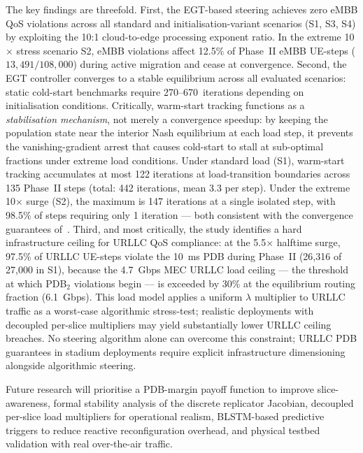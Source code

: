 \documentclass[conference]{IEEEtran}
\begin{document}
The key findings are threefold. First, the EGT-based
steering achieves zero eMBB QoS violations across all
standard and initialisation-variant scenarios (S1, S3, S4)
by exploiting the 10:1 cloud-to-edge processing exponent
ratio. In the extreme 10$\times$ stress scenario S2, eMBB
violations affect 12.5\% of Phase~II eMBB UE-steps
($13{,}491 / 108{,}000$) during active migration and cease
at convergence.
Second, the EGT controller converges to a stable equilibrium
across all evaluated scenarios: static cold-start benchmarks
require 270--670~iterations depending on initialisation
conditions. Critically, warm-start tracking functions as a
\emph{stabilisation mechanism}, not merely a convergence
speedup: by keeping the population state near the interior
Nash equilibrium at each load step, it prevents the
vanishing-gradient arrest that causes cold-start to stall at
sub-optimal fractions under extreme load conditions.
Under standard load (S1), warm-start tracking accumulates
at most 122 iterations at load-transition boundaries across
135 Phase~II steps (total: 442 iterations, mean 3.3 per step).
Under the extreme 10$\times$ surge (S2), the maximum is
147 iterations at a single isolated step, with 98.5\% of steps
requiring only 1 iteration --- both consistent with the
convergence guarantees of~\cite{Alevizaki2021upf}.
Third, and most critically, the study identifies a hard
infrastructure ceiling for URLLC QoS compliance: at the
5.5$\times$ halftime surge, 97.5\% of URLLC UE-steps
violate the 10~ms PDB during Phase~II (26,316 of 27,000
in S1), because the 4.7~Gbps MEC URLLC load ceiling ---
the threshold at which PDB$_2$ violations begin --- is
exceeded by 30\% at the equilibrium routing fraction
(6.1~Gbps). This load model applies a uniform $\lambda$
multiplier to URLLC traffic as a worst-case algorithmic
stress-test; realistic deployments with decoupled
per-slice multipliers may yield substantially lower
URLLC ceiling breaches. No steering algorithm alone
can overcome this constraint; URLLC PDB guarantees in
stadium deployments require explicit infrastructure
dimensioning alongside algorithmic steering.

Future research will prioritise a PDB-margin payoff
function to improve slice-awareness, formal stability
analysis of the discrete replicator Jacobian, decoupled
per-slice load multipliers for operational realism,
BLSTM-based predictive triggers to reduce reactive
reconfiguration overhead, and physical testbed
validation with real over-the-air traffic.

\end{document}
